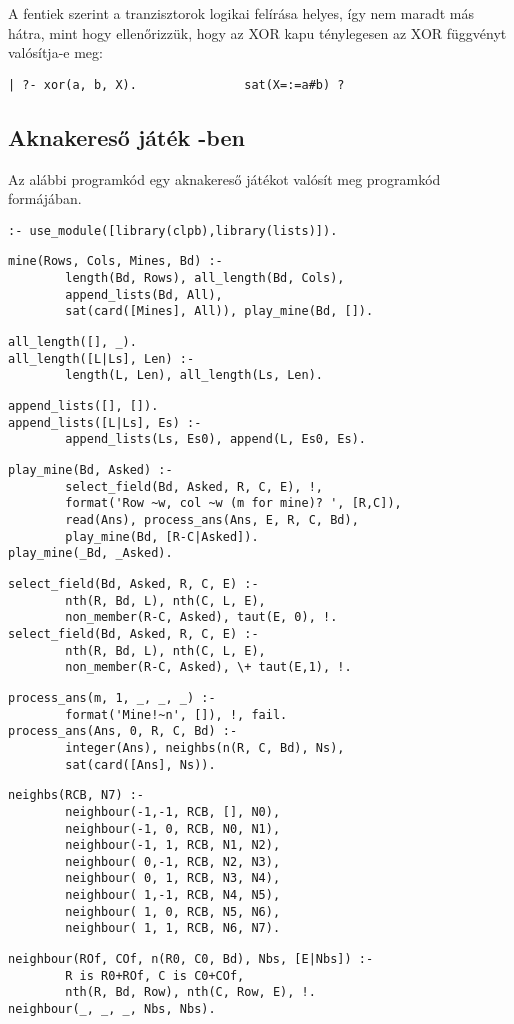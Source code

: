 A fentiek szerint a tranzisztorok logikai felírása helyes, így nem
maradt más hátra, mint hogy ellenőrizzük, hogy az XOR kapu ténylegesen
az XOR függvényt valósítja-e meg:

\begin{verbatim}
| ?- xor(a, b, X).               sat(X=:=a#b) ?
\end{verbatim}

\subsection{Aknakereső játék \Clpb -ben}

Az alábbi programkód egy aknakereső játékot valósít meg \clpb programkód
formájában.

\begin{verbatim}
:- use_module([library(clpb),library(lists)]).
\end{verbatim}
\begin{verbatim}
mine(Rows, Cols, Mines, Bd) :-
        length(Bd, Rows), all_length(Bd, Cols), 
        append_lists(Bd, All),
        sat(card([Mines], All)), play_mine(Bd, []).
\end{verbatim}
\begin{verbatim}
all_length([], _).
all_length([L|Ls], Len) :- 
        length(L, Len), all_length(Ls, Len).
\end{verbatim}
\begin{verbatim}
append_lists([], []).
append_lists([L|Ls], Es) :-
        append_lists(Ls, Es0), append(L, Es0, Es).
\end{verbatim}
\begin{verbatim}
play_mine(Bd, Asked) :- 
        select_field(Bd, Asked, R, C, E), !,
        format('Row ~w, col ~w (m for mine)? ', [R,C]), 
        read(Ans), process_ans(Ans, E, R, C, Bd), 
        play_mine(Bd, [R-C|Asked]).
play_mine(_Bd, _Asked).
\end{verbatim}
\begin{verbatim}
select_field(Bd, Asked, R, C, E) :-
        nth(R, Bd, L), nth(C, L, E), 
        non_member(R-C, Asked), taut(E, 0), !.
select_field(Bd, Asked, R, C, E) :-
        nth(R, Bd, L), nth(C, L, E), 
        non_member(R-C, Asked), \+ taut(E,1), !.
\end{verbatim}
\begin{verbatim}
process_ans(m, 1, _, _, _) :- 
        format('Mine!~n', []), !, fail.
process_ans(Ans, 0, R, C, Bd) :-
        integer(Ans), neighbs(n(R, C, Bd), Ns), 
        sat(card([Ans], Ns)).
\end{verbatim}
\begin{verbatim}
neighbs(RCB, N7) :-
        neighbour(-1,-1, RCB, [], N0), 
        neighbour(-1, 0, RCB, N0, N1),
        neighbour(-1, 1, RCB, N1, N2), 
        neighbour( 0,-1, RCB, N2, N3),
        neighbour( 0, 1, RCB, N3, N4), 
        neighbour( 1,-1, RCB, N4, N5),
        neighbour( 1, 0, RCB, N5, N6), 
        neighbour( 1, 1, RCB, N6, N7).
\end{verbatim}
\begin{verbatim}
neighbour(ROf, COf, n(R0, C0, Bd), Nbs, [E|Nbs]) :-
        R is R0+ROf, C is C0+COf, 
        nth(R, Bd, Row), nth(C, Row, E), !.
neighbour(_, _, _, Nbs, Nbs).
\end{verbatim}

